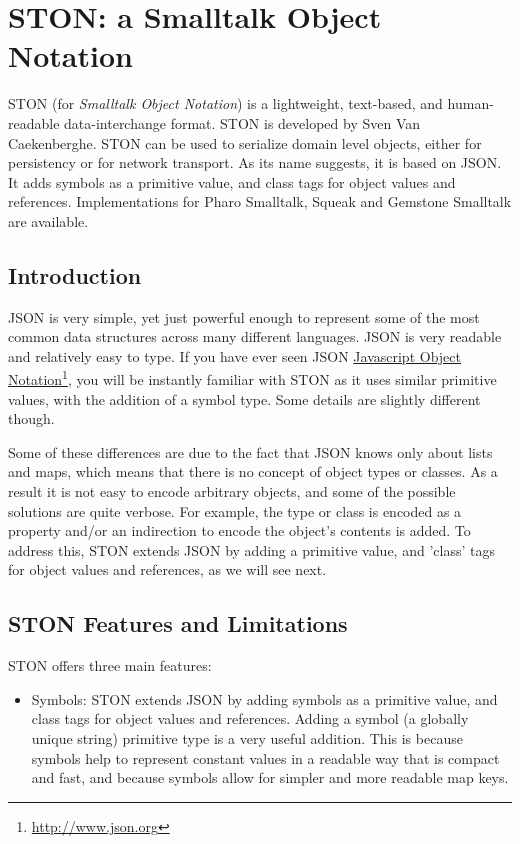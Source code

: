 \documentclass[10pt,twoside,english]{_support/latex/sbabook/sbabook}
\begin{document}
\frontmatter
\pagestyle{plain}

\tableofcontents*
\clearpage\listoffigures

\mainmatter

\chapter{STON: a Smalltalk Object Notation}
STON (for \textit{Smalltalk Object Notation}) is a lightweight, text-based, and human-readable data-interchange format. STON is developed by Sven Van Caekenberghe. STON can
be used to serialize domain level objects, either for persistency or for network transport.
As its name suggests, it is based on JSON. It adds symbols as a primitive value, and class tags for object
values and references. Implementations for Pharo Smalltalk, Squeak and Gemstone Smalltalk are available.
\section{Introduction}
JSON is very simple, yet just powerful enough to represent some of the most common data structures across many different
languages. JSON is very readable and relatively easy to type. If you have ever seen JSON \href{http://www.json.org}{Javascript Object Notation}\footnote{\url{http://www.json.org}}, you will be instantly
familiar with STON as it uses similar primitive values, with the addition of a symbol type. Some details are slightly different though.

Some of these differences are due to the fact that JSON knows only about lists and maps, which means that there is no concept of object types or classes. As a
result it is not easy to encode arbitrary objects, and some of the possible solutions are quite verbose. For example, the type or class is encoded as a property
and/or an indirection to encode the object's contents is added. To address this, STON extends JSON by adding a primitive value, and 'class' tags for object
values and references, as we will see next.
\section{STON Features and Limitations}
STON offers three main features:

\begin{itemize}
\item Symbols: STON extends JSON by adding symbols as a primitive value, and class tags for object values and references. Adding a symbol (a globally unique string) primitive type is a very useful addition. This is because symbols help to represent constant values in a readable way that is compact and fast, and because  symbols allow for simpler and more readable map keys.
\end{itemize}
\end{document}
